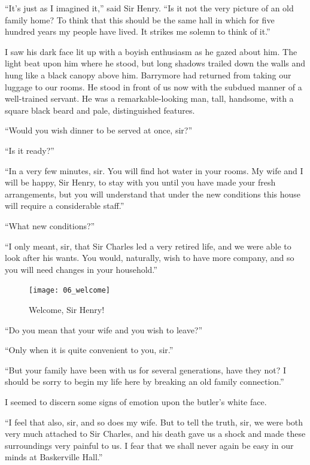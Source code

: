 \documentclass[paper=5.5in:8.5in,BCOR=7mm,twoside,DIV=calc,12pt,usegeometry,openany,chapterprefix,endperiod]{scrbook} %
\begin{document}
\enquote{It's just as I imagined it,} said Sir Henry. \enquote{Is it not the very picture of an old family home? To think that this should be the same hall in which for five hundred years my people have lived. It strikes me solemn to think of it.}

I saw his dark face lit up with a boyish enthusiasm as he gazed about him. The light beat upon him where he stood, but long shadows trailed down the walls and hung like a black canopy above him. Barrymore had returned from taking our luggage to our rooms. He stood in front of us now with the subdued manner of a well-trained servant. He was a remarkable-looking man, tall, handsome, with a square black beard and pale, distinguished features.

\enquote{Would you wish dinner to be served at once, sir?}

\enquote{Is it ready?}

\enquote{In a very few minutes, sir. You will find hot water in your rooms. My wife and I will be happy, Sir Henry, to stay with you until you have made your fresh arrangements, but you will understand that under the new conditions this house will require a considerable staff.}

\enquote{What new conditions?}

\enquote{I only meant, sir, that Sir Charles led a very retired life, and we were able to look after his wants. You would, naturally, wish to have more company, and so you will need changes in your household.}

\begin{figure}[tbph]
\centering
\texttt{[image: 06\_welcome]}
\caption{Welcome, Sir Henry!}
\end{figure}

\enquote{Do you mean that your wife and you wish to leave?}

\enquote{Only when it is quite convenient to you, sir.}

\enquote{But your family have been with us for several generations, have they not? I should be sorry to begin my life here by breaking an old family connection.}

I seemed to discern some signs of emotion upon the butler's white face.

\enquote{I feel that also, sir, and so does my wife. But to tell the truth, sir, we were both very much attached to Sir Charles, and his death gave us a shock and made these surroundings very painful to us. I fear that we shall never again be easy in our minds at Baskerville Hall.}
\end{document}
